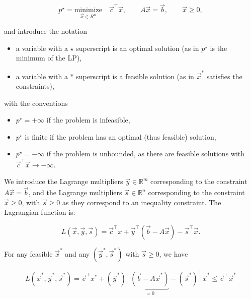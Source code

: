 \documentclass[11pt]{article}
\providecommand{\tightlist}{%
      \setlength{\itemsep}{0pt}\setlength{\parskip}{0pt}}
\begin{document}
\begin{equation*}
  p^\star = \underset{\vec{x} \in R^n }{\text{minimize}} \quad \vec{c}^\top \vec{x}, \qquad A \vec{x} = \vec{b}, \qquad \vec{x} \ge 0,
\end{equation*}

and introduce the notation

\begin{itemize}
\tightlist
\item
  a variable with a \(\star\) superscript is an optimal solution (as in
  \(p^\star\) is the minimum of the LP),
\item
  a variable with a \(*\) superscript is a feasible solution (as in
  \(\vec{x}^*\) satisfies the constraints),
\end{itemize}

with the conventions

\begin{itemize}
\tightlist
\item
  \(p^\star = + \infty\) if the problem is infeasible,
\item
  \(p^\star\) is finite if the problem has an optimal (thus feasible)
  solution,
\item
  \(p^\star = -\infty\) if the problem is unbounded, as there are
  feasible solutions with \(\vec{c}^\top \vec{x} \rightarrow -\infty\).
\end{itemize}

We introduce the Lagrange multipliers \(\vec{y} \in \mathbb{R}^m\)
corresponding to the constraint \(A \vec{x} = \vec{b}\), and the
Lagrange multipliers \(\vec{s} \in \mathbb{R}^n\) corresponding to the
constraint \(\vec{x} \ge 0\), with \(\vec{s} \ge 0\) as they correspond
to an inequality constraint. The Lagrangian function is:

\begin{equation}
\label{Eq:Lagrangian}
L(\vec{x},\vec{y},\vec{s}) = \vec{c}^\top x + \vec{y}^\top (\vec{b} - A \vec{x}) - \vec{s}^\top \vec{x}.
\end{equation}

For any feasible \(\vec{x}^*\) and any \((\vec{y}^*, \vec{s}^*)\) with
\(\vec{s} \ge 0\), we have

\begin{equation}
\label{Eq:LowerBound}
L(\vec{x}^*,\vec{y}^*,\vec{s}^*) = \vec{c}^\top x^* + (\vec{y}^*)^\top \underbrace{(\vec{b} - A \vec{x}^*)}_{=0} - (\vec{s}^*)^\top \vec{x}^* \le \vec{c}^\top \vec{x}^*
\end{equation}
\end{document}
